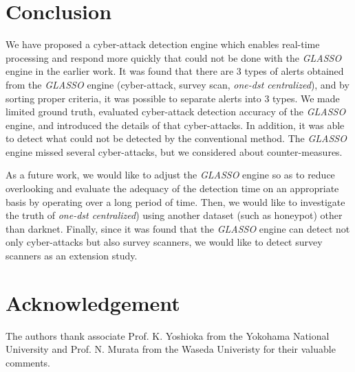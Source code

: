 \documentclass[conference]{IEEEtran}
\begin{document}



\section{Conclusion}
We have proposed a cyber-attack detection engine which enables real-time processing and respond more quickly that could not be done with the {\it GLASSO} engine in the earlier work.
It was found that there are 3 types of alerts obtained from the {\it GLASSO} engine (cyber-attack, survey scan, {\it one-dst centralized}), and by sorting proper criteria, it was possible to separate alerts into 3 types.
We made limited ground truth, evaluated cyber-attack detection accuracy of the {\it GLASSO} engine, and introduced the details of that cyber-attacks.
In addition, it was able to detect what could not be detected by the conventional method.
The {\it GLASSO} engine missed several cyber-attacks, but we considered about counter-measures.


As a future work, we would like to adjust the {\it GLASSO} engine so as to reduce overlooking and evaluate the adequacy of the detection time on an appropriate basis by operating over a long period of time.
Then, we would like to investigate the truth of {\it one-dst centralized}) using another dataset (such as honeypot) other than darknet.
Finally, since it was found that the {\it GLASSO} engine can detect not only cyber-attacks but also survey scanners, we would like to detect survey scanners as an extension study.



\section*{Acknowledgement}
The authors thank associate Prof. K. Yoshioka from the Yokohama National University and  Prof. N. Murata from the Waseda Univeristy for their valuable comments.
\end{document}
